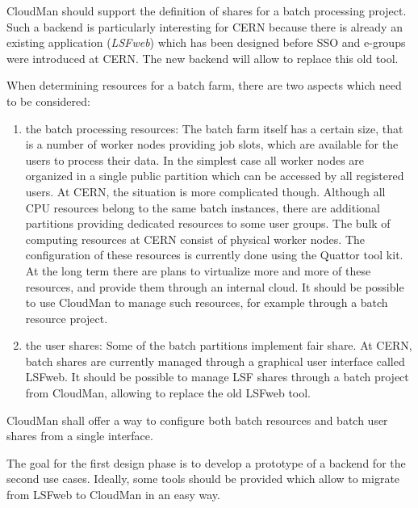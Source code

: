 CloudMan should support the definition of shares for a batch processing project. 
Such a backend is particularly interesting for CERN because there is already an
existing application ({\it LSFweb}) which has been designed before SSO and 
e-groups were introduced at CERN. The new backend will allow to replace this old 
tool. 

When determining resources for a batch farm, there are two aspects which need
to be considered:

\begin{enumerate}
\item the batch processing resources: The batch farm itself has a certain size, that is a number of worker nodes providing job slots, which are available for the users to process their data. In the simplest case all worker nodes are organized in a single public partition which can be accessed by all registered users. At CERN, the situation is more complicated though. Although all CPU resources belong to the same batch instances, there are additional partitions providing dedicated resources to some user groups. 
The bulk of computing resources at CERN consist of physical worker nodes. The configuration of these resources is currently done using the Quattor tool kit. At the long term there are plans to virtualize more and more of these resources, and provide them through an internal cloud. It should be possible to use CloudMan to manage such resources, for example through a batch resource project. 
 
\item the user shares: Some of the batch partitions implement fair share. At CERN, batch shares are currently managed through a graphical user interface called
LSFweb. It should be possible to manage LSF shares through a batch project from CloudMan, allowing to replace the old LSFweb tool.
\end{enumerate}

CloudMan shall offer a way to configure both batch resources and batch user shares from a single interface. 

The goal for the first design phase is to develop a prototype of a backend for the second use cases. Ideally, some tools should be provided which allow to migrate from LSFweb to CloudMan in an easy way.
